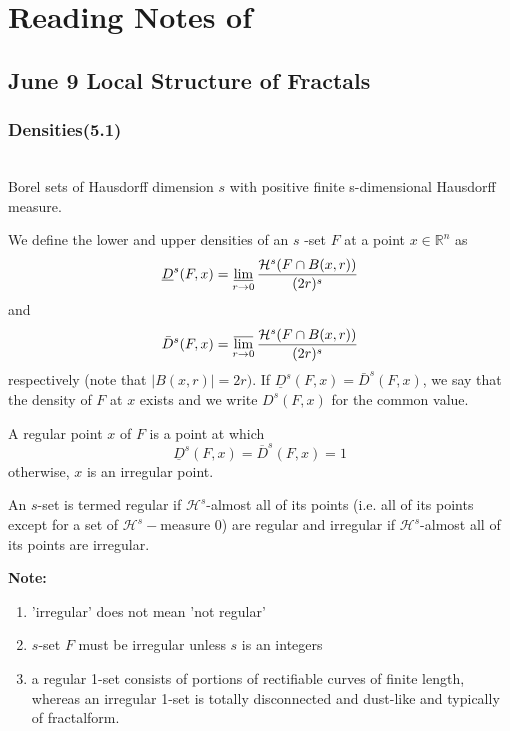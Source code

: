 \section{Reading Notes of \texorpdfstring{\cite{gf}}{Lg}}
\subsection{June 9 Local Structure of Fractals}
\subsubsection{Densities(5.1)}

\begin{definition}[$s$-sets] $ $\\
    Borel sets of Hausdorff dimension $s$ with positive finite s-dimensional Hausdorff measure.
\end{definition}

\begin{definition}
    We define the lower and upper densities of an $s$ -set $F$ at a point $x \in \mathbb{R}^{n}$ as
        $$
        \underline{D}^{s}(F, x)=\varliminf_{r \rightarrow 0} \frac{\mathcal{H}^{s}(F \cap B(x, r))}{(2 r)^{s}}
        $$
    and
        $$
        \bar{D}^s(F, x)=\varlimsup_{r \rightarrow 0} \frac{\mathcal{H}^{s}(F \cap B(x, r))}{(2 r)^{s}}
        $$
    respectively (note that $|B(x, r)|=2 r)$. If $\underline{D}^{s}(F, x)=\bar{D}^{s}(F, x)$, we say that the density of $F$ at $x$ exists and we write $D^{s}(F, x)$ for the common value.
\end{definition}

\begin{definition}
    A regular point $x$ of $F$ is a point at which $$\underline{D}^s(F, x) = \overline{D}^s(F, x) = 1$$
    otherwise, $x$ is an irregular point. 
\end{definition}

\begin{definition}
    An $s$-set is termed regular if $\mathcal{H}^{s}$-almost all of its points (i.e. all of its points except for a set of $\mathcal{H}^{s}-$measure 0) are regular and irregular if $\mathcal{H}^{s}$-almost all of its points are irregular.
\end{definition}

\textbf{Note: }\begin{enumerate}
    \item 'irregular' does not mean 'not regular'
    \item $s$-set $F$ must be irregular unless $s$ is an integers
    \item a regular 1-set consists of portions of rectifiable curves of finite length, whereas an irregular 1-set is totally disconnected and dust-like and typically of fractalform.
\end{enumerate}


